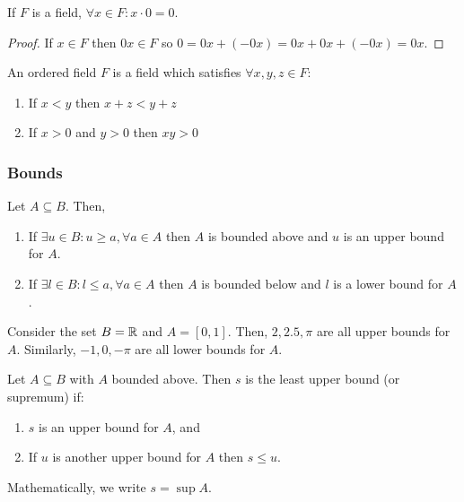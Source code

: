 \begin{theorem}
    If $F$ is a field, $\forall x \in F: x \cdot 0 = 0$.
\end{theorem}

\begin{proof}
    If $x \in F$ then $0x \in F$ so $0 = 0x + (-0x) = 0x + 0x + (-0x) = 0x$.
\end{proof}

\begin{definition}
    An ordered field $F$ is a field which satisfies $\forall x, y, z \in F$:
    \begin{enumerate}
        \item If $x < y$ then $x + z < y + z$
        \item If $x > 0$ and $y > 0$ then $xy > 0$ 
    \end{enumerate}
\end{definition}

\subsubsection{Bounds}

\begin{definition}[Bounds]
    Let $A \subseteq B$. Then,
    \begin{enumerate}
        \item If $\exists u \in B: u \geq a, \forall a \in A$ then $A$ is bounded above and $u$ is an upper bound for $A$.
        \item If $\exists l \in B: l \leq a, \forall a \in A$ then $A$ is bounded below and $l$ is a lower bound for $A$.
    \end{enumerate}
\end{definition}

\begin{eg}
    Consider the set $B = \mathbb{R}$ and $A = [0,1]$. Then, $2, 2.5, \pi$ are all upper bounds for $A$. Similarly, $-1, 0, -\pi$ are all lower bounds for $A$.      
\end{eg}

\begin{definition}[Supremum]
    Let $A \subseteq B$ with $A$ bounded above. Then $s$ is the least upper bound (or supremum) if:
    \begin{enumerate}
        \item $s$ is an upper bound for $A$, and
        \item If $u$ is another upper bound for $A$ then $s \leq u$.
    \end{enumerate}
    Mathematically, we write $s = \sup A$.
\end{definition}

